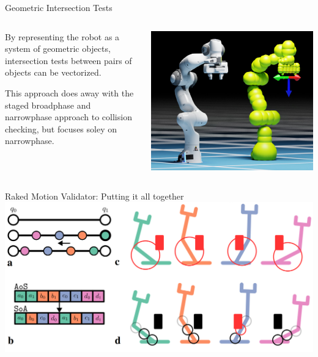 \documentclass{beamer}
\begin{document}
\begin{frame}{Geometric Intersection Tests}
\begin{columns}
\begin{column}{0.5\textwidth}
By representing the robot as a system of geometric objects, intersection tests between pairs of objects can be vectorized.

\vspace{10px}

This approach does away with the staged broadphase and narrowphase approach to collision checking, but focuses soley on narrowphase.
\end{column}
\begin{column}{0.5\textwidth}
\includegraphics[width=\textwidth]{./assets/panda_spheres.png}
\end{column}
\end{columns}
\end{frame}

\begin{frame}{Raked Motion Validator: Putting it all together}
\centering
\includegraphics[width=\textwidth]{./assets/mim_raked_mv_rearrange.png}
\end{frame}
\end{document}
